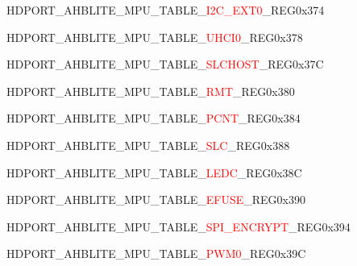 \vspace{-3em}
\begin{register}{H}{DPORT\_AHBLITE\_MPU\_TABLE\_\textcolor{red}{I2C\_EXT0}\_REG}{0x374}\label{regdesc:AHBLITEMPUTABLEI2CEXT0REG}
\end{register}
\vspace{-3em}
\begin{register}{H}{DPORT\_AHBLITE\_MPU\_TABLE\_\textcolor{red}{UHCI0}\_REG}{0x378}\label{regdesc:AHBLITEMPUTABLEUHCI0REG}
\end{register}
\vspace{-3em}
\begin{register}{H}{DPORT\_AHBLITE\_MPU\_TABLE\_\textcolor{red}{SLCHOST}\_REG}{0x37C}\label{regdesc:AHBLITEMPUTABLESLCHOSTREG}
\end{register}
\vspace{-3em}
\begin{register}{H}{DPORT\_AHBLITE\_MPU\_TABLE\_\textcolor{red}{RMT}\_REG}{0x380}\label{regdesc:AHBLITEMPUTABLERMTREG}
\end{register}
\vspace{-3em}
\begin{register}{H}{DPORT\_AHBLITE\_MPU\_TABLE\_\textcolor{red}{PCNT}\_REG}{0x384}\label{regdesc:AHBLITEMPUTABLEPCNTREG}
\end{register}
\vspace{-3em}
\begin{register}{H}{DPORT\_AHBLITE\_MPU\_TABLE\_\textcolor{red}{SLC}\_REG}{0x388}\label{regdesc:AHBLITEMPUTABLESLCREG}
\end{register}
\vspace{-3em}
\begin{register}{H}{DPORT\_AHBLITE\_MPU\_TABLE\_\textcolor{red}{LEDC}\_REG}{0x38C}\label{regdesc:AHBLITEMPUTABLELEDCREG}
\end{register}
\vspace{-3em}
\begin{register}{H}{DPORT\_AHBLITE\_MPU\_TABLE\_\textcolor{red}{EFUSE}\_REG}{0x390}\label{regdesc:AHBLITEMPUTABLEEFUSEREG}
\end{register}
\vspace{-3em}
\begin{register}{H}{DPORT\_AHBLITE\_MPU\_TABLE\_\textcolor{red}{SPI\_ENCRYPT}\_REG}{0x394}\label{regdesc:AHBLITEMPUTABLESPIENCRYPTREG}
\end{register}
\vspace{-3em}
\begin{register}{H}{DPORT\_AHBLITE\_MPU\_TABLE\_\textcolor{red}{PWM0}\_REG}{0x39C}\label{regdesc:AHBLITEMPUTABLEPWM0REG}
\end{register}
